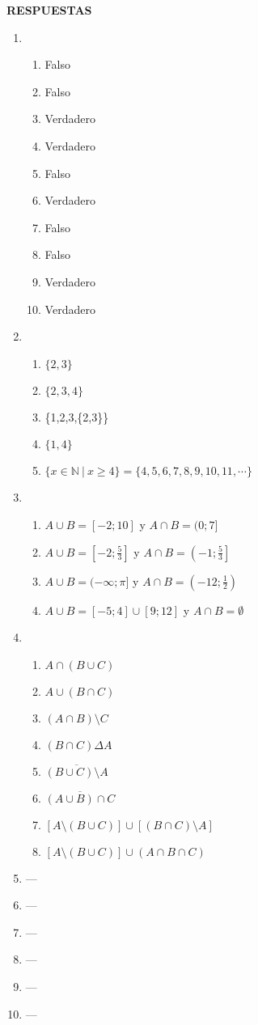 \documentclass[a4paper]{article}
\newcommand{\exercise}{\item}
\newcommand{\intersec}{\cap}
\newcommand{\union}{\cup}
\newcommand{\symdiff}{\Delta}
\newcommand{\compl}[1]{\overline{#1}}
\newcommand{\df}[2]{\displaystyle\frac{#1}{#2}}
\begin{document}
 \textbf{RESPUESTAS}\begin{enumerate}\exercise\begin{enumerate} [label=(\alph*)]		\item Falso
		\item Falso
		\item Verdadero
		\item Verdadero
		\item Falso
		\item Verdadero
		\item Falso
		\item Falso
		\item Verdadero
		\item Verdadero
\end{enumerate}\exercise\begin{enumerate} [label=(\alph*)]		\item $\{2,3\}$
		\item $\{2,3,4\}$
		\item \{1,2,3,\{2,3\}\}
		\item $\{1,4\}$
		\item $\{ x \in \mathbb{N} ~|~ x \geq 4 \}= \{4,5,6,7,8,9,10,11, \cdots \}$
\end{enumerate}\exercise\begin{enumerate} [label=(\alph*)]		\item $A \union B = [-2;10]$ y $A \intersec B = (0;7]$
		\item $A \union B = \left[-2;\df{5}{3}\right]$ y $A \intersec B = \left(-1;\df{5}{3}\right]$
		\item $A \union B = (-\infty;\pi]$ y $A \intersec B = \left(-12;\df{1}{2}\right)$
		\item $A \union B = [-5;4] \union [9;12]$ y $A \intersec B = \emptyset$
\end{enumerate}\exercise\begin{enumerate} [label=(\alph*)]		\item $A \intersec (B \union C)$
		\item $A \union (B \intersec C)$
		\item $(A \intersec B) \setminus C$
		\item $(B \intersec C) \symdiff A$
		\item $\compl{(B \union C) \setminus A}$
		\item $\compl{(A \union B) \intersec C}$
		\item $[ A \setminus (B \union C) ] \union [(B \intersec C) \setminus A ]$
		\item $[A \setminus (B \union C)] \union (A \intersec B \intersec C)$
\end{enumerate}\exercise---\exercise---\exercise---\exercise---\exercise---\exercise---\end{enumerate}
\end{document}
